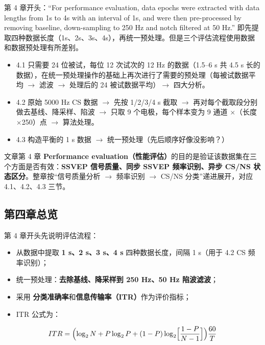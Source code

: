 \documentclass[12pt, a4paper]{ctexart}
\begin{document}
第 4 章开头：``For performance evaluation, data epochs were extracted with data lengths from 1s to 4s with an interval of 1s, and were then pre-processed by removing baseline, down-sampling to 250 Hz and notch filtered at 50 Hz.'' 即先提取四种数据长度（1s、2s、3s、4s），再统一预处理。但是三个评估流程使用数据和数据预处理有所差别。

\begin{itemize}
  \item 4.1 只需要 24 位被试，每位 12 次试次的 12 Hz 的数据（1.5--6 s 共 4.5 s 长的数据），在统一预处理操作的基础上再次进行了需要的预处理（每被试数据平均 $\rightarrow$ 滤波 $\rightarrow$ 处理后的 24 被试数据平均）$\rightarrow$ 四大分析。
  \item 4.2 原始 5000 Hz CS 数据 $\rightarrow$ 先按 1/2/3/4 s 截取 $\rightarrow$ 再对每个截取段分别做去基线、降采样、陷波 $\rightarrow$ 只取 9 个电极，每个样本变为 9 通道 $\times$（长度$\times$250）点 $\rightarrow$ 算法处理。
  \item 4.3 构造平衡的 1 s 数据 $\rightarrow$ 统一预处理（先后顺序好像没影响？）
\end{itemize}

文章第 4 章 \textbf{Performance evaluation（性能评估）}的目的是验证该数据集在三个方面是否有效：\textbf{SSVEP 信号质量、同步 SSVEP 频率识别、异步 CS/NS 状态区分}。整章按``信号质量分析 $\rightarrow$ 频率识别 $\rightarrow$ CS/NS 分类''递进展开，对应 4.1、4.2、4.3 三节。

\subsection{第四章总览}

第 4 章开头先说明评估流程：

\begin{itemize}
  \item 从数据中提取 \textbf{1 s、2 s、3 s、4 s} 四种数据长度，间隔 1 s（用于 4.2 CS 频率识别）；
  \item 统一预处理：\textbf{去除基线、降采样到 250 Hz、50 Hz 陷波滤波}；
  \item 采用 \textbf{分类准确率}和\textbf{信息传输率（ITR）}作为评价指标；
  \item ITR 公式为：
\end{itemize}

\begin{equation}
ITR=\Bigl(\log_2 N+P\log_2 P+(1-P)\log_2\Bigl[\frac{1-P}{N-1}\Bigr]\Bigr)\frac{60}{T}
\end{equation}
\end{document}
